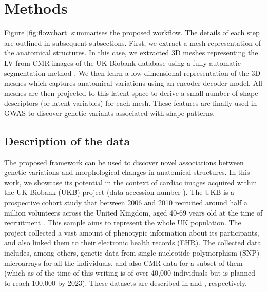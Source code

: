 \appendix
\section{Methods}
Figure \ref{fig:flowchart} summarises the proposed workflow. The details of each step are outlined in subsequent subsections. First, we extract a mesh representation of the anatomical structures. In this case, we extracted 3D meshes representing the LV from CMR images of the UK Biobank database using a fully automatic segmentation method \cite{ref_rahman}. We then learn a low-dimensional representation of the 3D meshes which captures anatomical variations using an encoder-decoder model. All meshes are then projected to this latent space to derive a small number of shape descriptors (or latent variables) for each mesh. These features are finally used in GWAS to discover genetic variants associated with shape patterns. 



\subsection{Description of the data}
The proposed framework can be used to discover novel associations between genetic variations and morphological changes in anatomical structures. In this work, we showcase its potential in the context of cardiac images acquired within the UK Biobank (UKB) project (data accession number \ACCESSIONNUMBER). The UKB is a prospective cohort study that between 2006 and 2010 recruited around half a million volunteers across the United Kingdom, aged 40-69 years old at the time of recruitment \cite{ref_ukbb}. This sample aims to represent the whole UK population. The project collected a vast amount of phenotypic information about its participants, and also linked them to their electronic health records (EHR). The collected data includes, among others, genetic data from single-nucleotide polymorphism (SNP) microarrays for all the individuals, and also CMR data for a subset of them (which as of the time of this writing is of over 40,000 individuals but is planned to reach 100,000 by 2023). These datasets are described in \cite{ref_ukbb_genetics} and \cite{ref_ukbb_cmr}, respectively.

